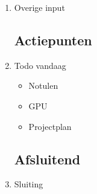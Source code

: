 \documentclass{article}
\begin{document}
\begin{enumerate}
	\item Overige input
	\subsection*{Actiepunten}
	\item Todo vandaag
	\begin{itemize}
		\item Notulen
		\item GPU
		\item Projectplan
	\end{itemize}

	\noindent 
	\subsection*{Afsluitend}
	\item Sluiting

\end{enumerate}
\end{document}
